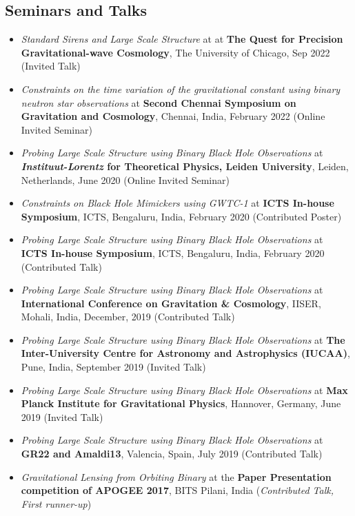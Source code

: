 \documentclass[margin, centered]{res}
\begin{document}
\begin{resume}
\section{Seminars and Talks}
\begin{itemize}[leftmargin=*]
    \item \textit{Standard Sirens and Large Scale Structure} at at \textbf{The Quest for Precision Gravitational-wave Cosmology}, The University of Chicago, Sep 2022 (Invited Talk)
	 \item \textit{Constraints on the time variation of the gravitational constant using binary neutron star observations} at \textbf{Second Chennai Symposium on Gravitation and Cosmology}, Chennai, India, February 2022 (Online Invited Seminar)
	 \item \textit{Probing Large Scale Structure using Binary Black Hole Observations} at \textbf{\textit{Instituut-Lorentz} for Theoretical Physics, Leiden University}, Leiden, Netherlands, June 2020 (Online Invited Seminar)
	 \item \textit{Constraints on Black Hole Mimickers using GWTC-1} at \textbf{ICTS In-house Symposium}, ICTS, Bengaluru, India, February 2020 (Contributed Poster)
	 \item \textit{Probing Large Scale Structure using Binary Black Hole Observations} at \textbf{ICTS In-house Symposium}, ICTS, Bengaluru, India, February 2020 (Contributed Talk)
	 \item \textit{Probing Large Scale Structure using Binary Black Hole Observations} at \textbf{International Conference on Gravitation \& Cosmology}, IISER, Mohali, India, December, 2019 (Contributed Talk)
	 \item \textit{Probing Large Scale Structure using Binary Black Hole Observations} at \textbf{The Inter-University Centre for Astronomy and Astrophysics (IUCAA)}, Pune, India, September 2019 (Invited Talk)
	 \item \textit{Probing Large Scale Structure using Binary Black Hole Observations} at \textbf{Max Planck Institute for Gravitational Physics}, Hannover, Germany, June 2019 (Invited Talk)
	\item \textit{Probing Large Scale Structure using Binary Black Hole Observations} at \textbf{GR22 and Amaldi13}, Valencia, Spain, July 2019 (Contributed Talk)
	\item \textit{Gravitational Lensing from Orbiting Binary} at the \textbf{Paper Presentation competition of APOGEE 2017}, BITS Pilani, India (\textit{Contributed Talk, First runner-up})


\end{itemize}
\end{resume}
\end{document}
